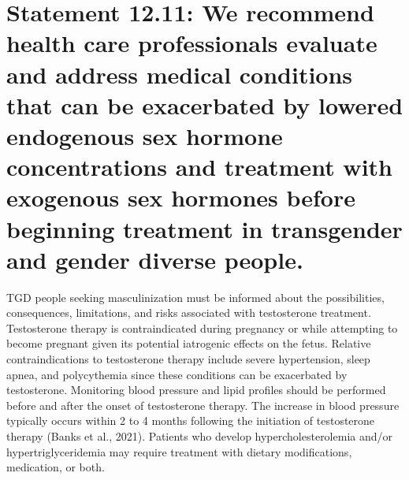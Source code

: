 \documentclass[
]{book}
\begin{document}
\hypertarget{statement-12.11-we-recommend-health-care-professionals-evaluate-and-address-medical-conditions-that-can-be-exacerbated-by-lowered-endogenous-sex-hormone-concentrations-and-treatment-with-exogenous-sex-hormones-before-beginning-treatment-in-transgender-and-gender-diverse-people.}{%
\section*{Statement 12.11: We recommend health care professionals evaluate and address medical conditions that can be exacerbated by lowered endogenous sex hormone concentrations and treatment with exogenous sex hormones before beginning treatment in transgender and gender diverse people.}\label{statement-12.11-we-recommend-health-care-professionals-evaluate-and-address-medical-conditions-that-can-be-exacerbated-by-lowered-endogenous-sex-hormone-concentrations-and-treatment-with-exogenous-sex-hormones-before-beginning-treatment-in-transgender-and-gender-diverse-people.}}

TGD people seeking masculinization must be
informed about the possibilities, consequences,
limitations, and risks associated with testosterone
treatment. Testosterone therapy is contraindicated
during pregnancy or while attempting to become
pregnant given its potential iatrogenic effects on
the fetus. Relative contraindications to testosterone therapy include severe hypertension, sleep
apnea, and polycythemia since these conditions
can be exacerbated by testosterone. Monitoring
blood pressure and lipid profiles should be performed before and after the onset of testosterone
therapy. The increase in blood pressure typically
occurs within 2 to 4 months following the initiation of testosterone therapy (Banks et al.,
2021). Patients who develop hypercholesterolemia
and/or hypertriglyceridemia may require treatment with dietary modifications, medication,
or both.
\end{document}
